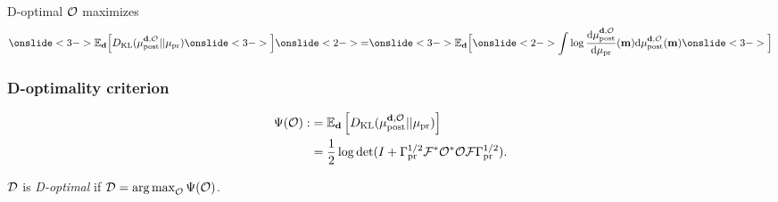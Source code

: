 \documentclass{beamer}
\begin{document}
\begin{frame}
  D-optimal \(\mathcal{O}\) maximizes
  \begin{equation*}
    \onslide<3->{\mathbb{E}_{\data} \Big [}D_{\text{KL}} (\post || \pr ) \onslide<3->{\Big ]}
    \onslide<2->{=} \onslide<3->{\mathbb{E}_{\data} \Big [}\onslide<2->{\int \log \frac{\der \post}{\der \pr}(\param) \der \post(\param)}  \onslide<3->{\Big ]}
  \end{equation*}




  
\end{frame}

\begin{frame}
  \frametitle{D-optimality criterion}
  \begin{theorem}\label{thm:d optimality}
    \begin{align*}
      \begin{split}
        \Psi( \mathcal{O}) :&= \mathbb{E}_{\mathbf{d}}\left [ D_{\text{KL}} (\mu_{\textup{post}}^{\mathbf{d}, \mathcal{O}} || \mu_{\textup{pr}} ) \right ] \\
        &= \frac12 \log \det 
        ( I +  \Gamma_{\textup{pr}}^{1/2}  \mathcal{F} ^* \mathcal{O}^* \mathcal{O} \mathcal{F} \Gamma_{\textup{pr}}^{1/2}).
      \end{split}
    \end{align*}
  \end{theorem}

  \pause
  \begin{definition}
  \(\mathcal{D}\) is \emph{D-optimal} if \(\mathcal{D} = \operatorname*{arg\,max}_{\mathcal{O}}
  \Psi(\mathcal{O})\).
  \end{definition}


\end{frame}
\end{document}
